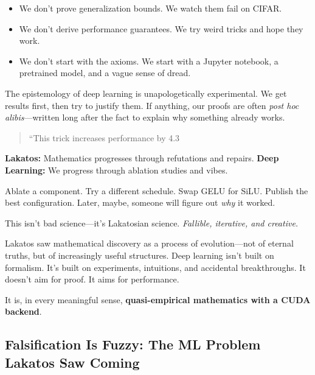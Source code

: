 \begin{itemize}
  \item We don’t prove generalization bounds. We watch them fail on CIFAR.
  \item We don’t derive performance guarantees. We try weird tricks and hope they work.
  \item We don’t start with the axioms. We start with a Jupyter notebook, a pretrained model, and a vague sense of dread.
\end{itemize}

The epistemology of deep learning is unapologetically experimental. We get results first, then try to justify them. If anything, our proofs are often \textit{post hoc alibis}—written long after the fact to explain why something already works.

\begin{quote}
    “This trick increases performance by 4.3%
\end{quote}

\bigskip

\begin{tcolorbox}[colback=gray!5!white, colframe=black, title=\textbf{Sidebar: Empirical Until Proven Otherwise}, fonttitle=\bfseries, arc=1.5mm, boxrule=0.4pt]
\textbf{Lakatos:} Mathematics progresses through refutations and repairs.  
\textbf{Deep Learning:} We progress through ablation studies and vibes.

\medskip

Ablate a component. Try a different schedule. Swap GELU for SiLU. Publish the best configuration.  
Later, maybe, someone will figure out \textit{why} it worked.

\medskip

This isn’t bad science—it’s Lakatosian science.  
\textit{Fallible, iterative, and creative.}
\end{tcolorbox}

\bigskip

Lakatos saw mathematical discovery as a process of evolution—not of eternal truths, but of increasingly useful structures. Deep learning isn’t built on formalism. It’s built on experiments, intuitions, and accidental breakthroughs. It doesn’t aim for proof. It aims for performance.

It is, in every meaningful sense, \textbf{quasi-empirical mathematics with a CUDA backend}.


\subsection{Falsification Is Fuzzy: The ML Problem Lakatos Saw Coming}

